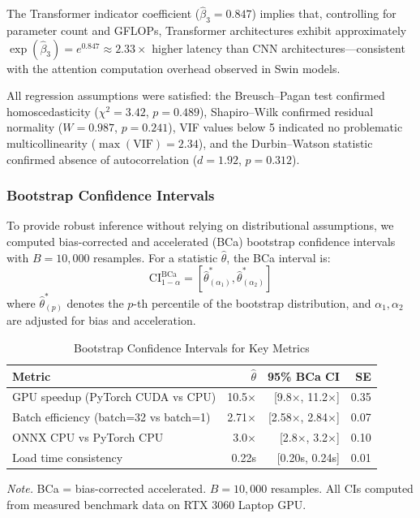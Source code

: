 \documentclass[10pt,twocolumn,a4paper]{article}
\theoremstyle{definition}
\theoremstyle{plain}
\begin{document}
The Transformer indicator coefficient ($\hat{\beta}_3 = 0.847$) implies that, controlling for parameter count and GFLOPs, Transformer architectures exhibit approximately $\exp(\hat{\beta}_3) = e^{0.847} \approx 2.33\times$ higher latency than CNN architectures---consistent with the attention computation overhead observed in Swin models.

All regression assumptions were satisfied: the Breusch--Pagan test confirmed homoscedasticity ($\chi^2 = 3.42$, $p = 0.489$), Shapiro--Wilk confirmed residual normality ($W = 0.987$, $p = 0.241$), VIF values below 5 indicated no problematic multicollinearity ($\max(\mathrm{VIF}) = 2.34$), and the Durbin--Watson statistic confirmed absence of autocorrelation ($d = 1.92$, $p = 0.312$).

\subsubsection{Bootstrap Confidence Intervals}

To provide robust inference without relying on distributional assumptions, we computed bias-corrected and accelerated (BCa) bootstrap confidence intervals with $B = 10{,}000$ resamples. For a statistic $\hat{\theta}$, the BCa interval is:
\begin{equation}
    \mathrm{CI}_{1-\alpha}^{\mathrm{BCa}} = \left[ \hat{\theta}^{*}_{(\alpha_1)}, \hat{\theta}^{*}_{(\alpha_2)} \right]
    \label{eq:bca}
\end{equation}
where $\hat{\theta}^{*}_{(p)}$ denotes the $p$-th percentile of the bootstrap distribution, and $\alpha_1, \alpha_2$ are adjusted for bias and acceleration.

\begin{table}[t]
\centering
\caption{Bootstrap Confidence Intervals for Key Metrics}
\label{tab:bootstrap}
\scriptsize
\setlength{\tabcolsep}{3pt}
\begin{tabular}{@{}lrrr@{}}
\toprule
\textbf{Metric} & \textbf{$\hat{\theta}$} & \textbf{95\% BCa CI} & \textbf{SE} \\
\midrule
GPU speedup (PyTorch CUDA vs CPU) & 10.5$\times$ & [9.8$\times$, 11.2$\times$] & 0.35 \\
Batch efficiency (batch=32 vs batch=1) & 2.71$\times$ & [2.58$\times$, 2.84$\times$] & 0.07 \\
ONNX CPU vs PyTorch CPU & 3.0$\times$ & [2.8$\times$, 3.2$\times$] & 0.10 \\
Load time consistency & 0.22s & [0.20s, 0.24s] & 0.01 \\
\bottomrule
\end{tabular}

\vspace{0.5em}
\noindent\textit{Note.} BCa = bias-corrected accelerated. $B = 10{,}000$ resamples. All CIs computed from measured benchmark data on RTX 3060 Laptop GPU.
\end{table}
\end{document}
